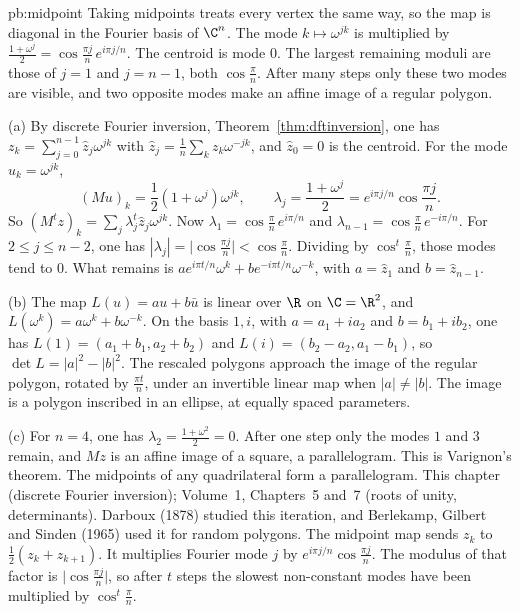 \begin{solution}{pb:midpoint}
\idea Taking midpoints treats every vertex the same way, so the map is diagonal in the Fourier basis of $\C^n$. The mode $k\mapsto\omega^{jk}$ is multiplied by $\frac{1+\omega^j}2=\cos\frac{\pi j}n\,e^{i\pi j/n}$. The centroid is mode $0$. The largest remaining moduli are those of $j=1$ and $j=n-1$, both $\cos\frac\pi n$. After many steps only these two modes are visible, and two opposite modes make an affine image of a regular polygon.

\writeup (a) By discrete Fourier inversion, Theorem~\ref{thm:dftinversion}, one has $z_k=\sum_{j=0}^{n-1}\hat z_j\omega^{jk}$ with $\hat z_j=\frac1n\sum_k z_k\omega^{-jk}$, and $\hat z_0=0$ is the centroid. For the mode $u_k=\omega^{jk}$,
\[
(Mu)_k=\frac12(1+\omega^j)\omega^{jk},\qquad\lambda_j=\frac{1+\omega^j}2=e^{i\pi j/n}\cos\frac{\pi j}n.
\]
So $(M^tz)_k=\sum_j\lambda_j^t\hat z_j\omega^{jk}$. Now $\lambda_1=\cos\frac\pi n\,e^{i\pi/n}$ and $\lambda_{n-1}=\cos\frac\pi n\,e^{-i\pi/n}$. For $2\le j\le n-2$, one has $|\lambda_j|=\bigl|\cos\frac{\pi j}n\bigr|<\cos\frac\pi n$. Dividing by $\cos^t\frac\pi n$, those modes tend to $0$. What remains is $a e^{i\pi t/n}\omega^k+b e^{-i\pi t/n}\omega^{-k}$, with $a=\hat z_1$ and $b=\hat z_{n-1}$.

(b) The map $L(u)=au+b\bar u$ is linear over $\R$ on $\C=\R^2$, and $L(\omega^k)=a\omega^k+b\omega^{-k}$. On the basis $1,i$, with $a=a_1+ia_2$ and $b=b_1+ib_2$, one has $L(1)=(a_1+b_1,a_2+b_2)$ and $L(i)=(b_2-a_2,a_1-b_1)$, so $\det L=|a|^2-|b|^2$. The rescaled polygons approach the image of the regular polygon, rotated by $\frac{\pi t}n$, under an invertible linear map when $|a|\ne|b|$. The image is a polygon inscribed in an ellipse, at equally spaced parameters.

(c) For $n=4$, one has $\lambda_2=\frac{1+\omega^2}2=0$. After one step only the modes $1$ and $3$ remain, and $Mz$ is an affine image of a square, a parallelogram. This is Varignon's theorem. The midpoints of any quadrilateral form a parallelogram.
\tools This chapter (discrete Fourier inversion); Volume~1, Chapters~5 and~7 (roots of unity, determinants).
\leads Darboux (1878) studied this iteration, and Berlekamp, Gilbert and Sinden (1965) used it for random polygons. The midpoint map sends $z_k$ to $\frac12(z_k+z_{k+1})$. It multiplies Fourier mode $j$ by $e^{i\pi j/n}\cos\frac{\pi j}n$. The modulus of that factor is $\bigl|\cos\frac{\pi j}n\bigr|$, so after $t$ steps the slowest non-constant modes have been multiplied by $\cos^t\frac\pi n$.
\end{solution}

